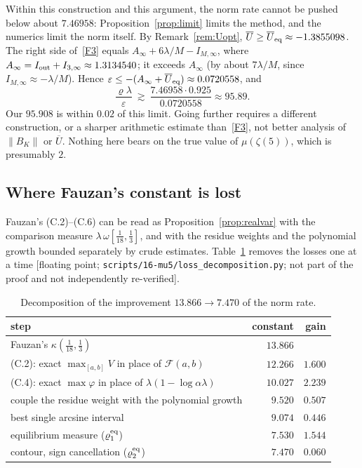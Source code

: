 \documentclass[11pt]{article}
\theoremstyle{remark}
\newcommand{\Ubar}{\overline{U}}
\newcommand{\file}[1]{\texttt{#1}}
\begin{document}
Within this construction and this argument, the norm rate cannot be pushed below about $7.46958$: Proposition~\ref{prop:limit} limits the method, and the numerics limit the norm itself. By Remark~\ref{rem:Uopt}, $\Ubar\ge\Ubar_{\rm eq}\approx-1.3855098$. The right side of~\ref{F3} equals $A_\infty+6\lambda/M-I_{M,\infty}$, where $A_\infty=I_{\rm out}+I_{3,\infty}\approx1.3134540$; it exceeds $A_\infty$ (by about $7\lambda/M$, since $I_{M,\infty}\approx-\lambda/M$). Hence $\varepsilon\le-(A_\infty+\Ubar_{\rm eq})\approx0.0720558$, and
\[
\frac{\varrho\lambda}{\varepsilon}\ \gtrsim\ \frac{7.46958\cdot0.925}{0.0720558}\approx95.89 .
\]
Our $95.908$ is within $0.02$ of this limit. Going further requires a different construction, or a sharper arithmetic estimate than~\ref{F3}, not better analysis of $\|B_K\|$ or $\Ubar$. Nothing here bears on the true value of $\mu(\zeta(5))$, which is presumably $2$.

\subsection{Where Fauzan's constant is lost}

Fauzan's (C.2)--(C.6) can be read as Proposition~\ref{prop:realvar} with the comparison measure $\lambda\,\omega[\frac1{18},\frac13]$, and with the residue weights and the polynomial growth bounded separately by crude estimates. Table~\ref{tab:loss} removes the losses one at a time [floating point; \file{scripts/16-mu5/loss\_decomposition.py}; not part of the proof and not independently re-verified].

\begin{table}[ht]
\centering
\begin{tabular}{lrr}
\toprule
step & constant & gain\\
\midrule
Fauzan's $\kappa(\frac1{18},\frac13)$ & $13.866$ & \\
(C.2): exact $\max_{[a,b]}V$ in place of $\mathcal F(a,b)$ & $12.266$ & $1.600$\\
(C.4): exact $\max\varphi$ in place of $\lambda(1-\log\alpha\lambda)$ & $10.027$ & $2.239$\\
couple the residue weight with the polynomial growth & $9.520$ & $0.507$\\
best single arcsine interval & $9.074$ & $0.446$\\
equilibrium measure ($\varrho_1^{\rm eq}$) & $7.530$ & $1.544$\\
contour, sign cancellation ($\varrho_2^{\rm eq}$) & $7.470$ & $0.060$\\
\bottomrule
\end{tabular}
\caption{Decomposition of the improvement $13.866\to7.470$ of the norm rate.}
\label{tab:loss}
\end{table}
\end{document}
